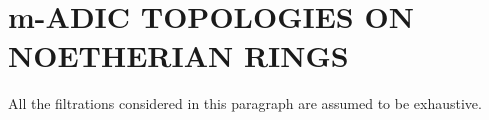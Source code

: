 \section{m-ADIC TOPOLOGIES ON NOETHERIAN RINGS}

All the filtrations considered in this paragraph are assumed to be exhaustive.

